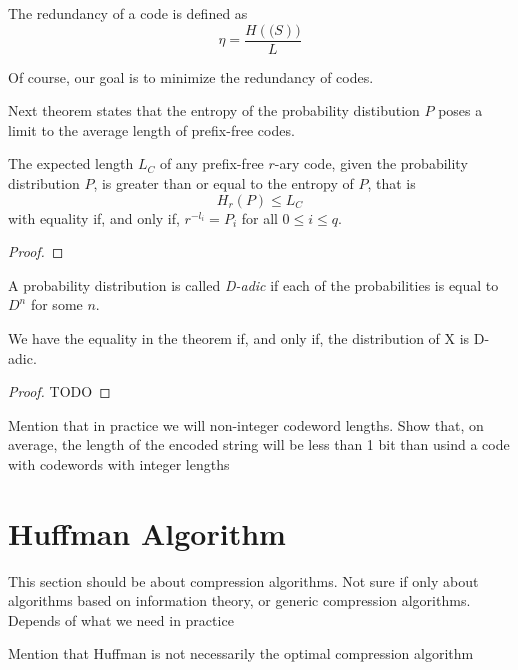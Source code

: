 \begin{definition}
The redundancy of a code is defined as
\[
\eta = \frac{H(\mathcal(S))}{L}
\]
\end{definition}

Of course, our goal is to minimize the redundancy of codes.

Next theorem states that the entropy of the probability distibution $P$ poses a limit to the average length of prefix-free codes.

\begin{theorem}
\label{th:optimal_codes}
The expected length $L_{C}$ of any prefix-free $r$-ary code, given the probability distribution $P$, is greater than or equal to the entropy of $P$, that is
\[
H_{r}(P) \leq L_{C}
\]
with equality if, and only if, $r^{-l_{i}} = P_{i}$ for all $0 \leq i \leq q$.
\end{theorem}
\begin{proof}
\end{proof}

\begin{definition}
A probability distribution is called \emph{D-adic} if each of the probabilities is equal to $D^n$ for some $n$.
\end{definition}

\begin{corollary}
We have the equality in the theorem if, and only if, the distribution of X is D-adic.
\end{corollary}
\begin{proof}
{\color{red} TODO}
\end{proof}

{\color{red} Mention that in practice we will non-integer codeword lengths. Show that, on average, the length of the encoded string will be less than 1 bit than usind a code with codewords with integer lengths} 

%
%

\section{Huffman Algorithm}
\label{sec:Huffman-Algorithm}

{\color{red} This section should be about compression algorithms. Not sure if only about algorithms based on information theory, or generic compression algorithms. Depends of what we need in practice}

{\color{red} Mention that Huffman is not necessarily the optimal compression algorithm}

